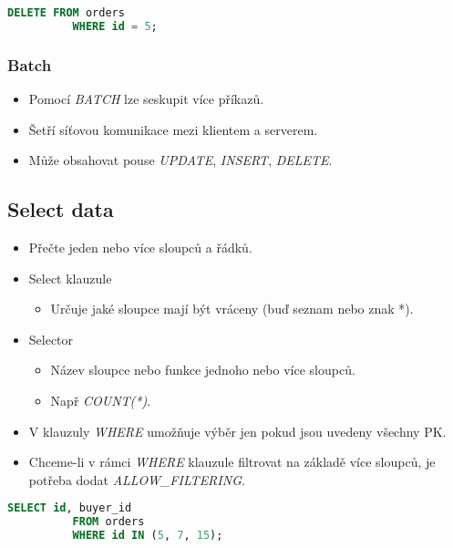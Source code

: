 \documentclass{article}
\begin{document}
        \begin{lstlisting}[language=sql]
          DELETE FROM orders
          WHERE id = 5;
        \end{lstlisting}

      \subsubsection{Batch}
        \begin{itemize}
          \item Pomocí \emph{BATCH} lze seskupit více příkazů.
          \item Šetří síťovou komunikace mezi klientem a serverem.
          \item Může obsahovat pouse \emph{UPDATE}, \emph{INSERT}, \emph{DELETE}.
        \end{itemize}

      \subsection{Select data}
        \begin{itemize}
          \item Přečte jeden nebo více sloupců a řádků.
          \item Select klauzule
            \begin{itemize}
              \item Určuje jaké sloupce mají být vráceny (buď seznam nebo znak *).
            \end{itemize}
          \item Selector
            \begin{itemize}
              \item Název sloupce nebo funkce jednoho nebo více sloupců.
              \item Např \emph{COUNT(*)}.
            \end{itemize}
          \item V klauzuly \emph{WHERE} umožňuje výběr jen pokud jsou uvedeny všechny PK.
          \item Chceme-li v rámci \emph{WHERE} klauzule filtrovat na základě více sloupců, je potřeba dodat \emph{ALLOW_FILTERING}.
        \end{itemize}

        \begin{lstlisting}[language=sql]
          SELECT id, buyer_id
          FROM orders
          WHERE id IN (5, 7, 15);
        \end{lstlisting}
\end{document}
